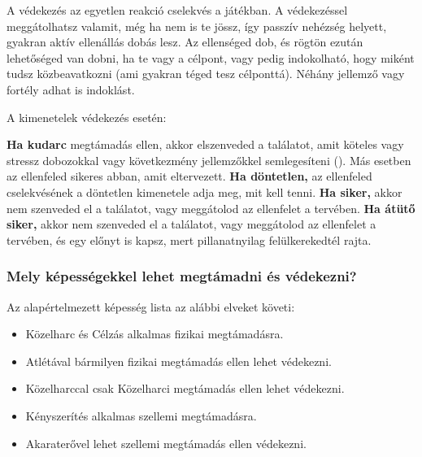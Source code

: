 A védekezés az egyetlen reakció cselekvés a  játékban. A védekezéssel meggátolhatsz valamit, még ha nem is te jössz, így passzív nehézség helyett, gyakran aktív ellenállás dobás lesz. Az ellenséged dob, és rögtön ezután lehetőséged van dobni, ha te vagy a célpont, vagy pedig indokolható, hogy miként tudsz közbeavatkozni (ami gyakran téged tesz célponttá). Néhány jellemző vagy fortély adhat is indoklást.

A kimenetelek védekezés esetén:

\begin{itemize}
    \failureitem \textbf{Ha kudarc} megtámadás ellen, akkor elszenveded a találatot, amit köteles vagy stressz dobozokkal vagy következmény jellemzőkkel semlegesíteni (). Más esetben az ellenfeled sikeres abban, amit eltervezett.
    \tieitem \textbf{Ha döntetlen,} az ellenfeled cselekvésének a döntetlen kimenetele adja meg, mit kell tenni.
    \successitem \textbf{Ha siker,} akkor nem szenveded el a találatot, vagy meggátolod az ellenfelet a tervében.
    \successwithstyleitem \textbf{Ha átütő siker,} akkor nem szenveded el a találatot, vagy meggátolod az ellenfelet a tervében, és egy előnyt is kapsz, mert pillanatnyilag felülkerekedtél rajta.
\end{itemize}


\subsubsection{Mely képességekkel lehet megtámadni és védekezni?}

Az alapértelmezett képesség lista az alábbi elveket követi:

\begin{itemize}
    \item Közelharc és Célzás alkalmas fizikai megtámadásra.
    \item Atlétával bármilyen fizikai megtámadás ellen lehet védekezni.
    \item Közelharccal csak Közelharci megtámadás ellen lehet védekezni.
    \item Kényszerítés alkalmas szellemi megtámadásra.
    \item Akaraterővel lehet szellemi megtámadás ellen védekezni.
\end{itemize}

